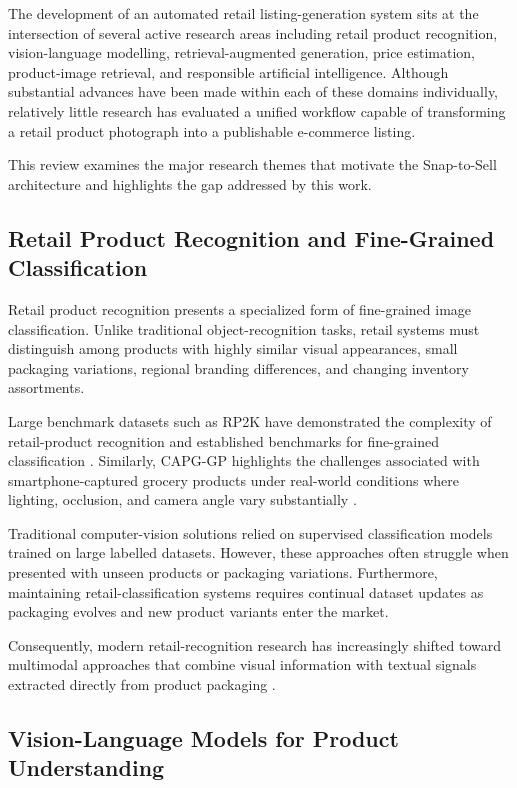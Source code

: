 \documentclass[conference]{IEEEtran}
\begin{document}
The development of an automated retail listing-generation system sits at the
intersection of several active research areas including retail product
recognition, vision-language modelling, retrieval-augmented generation,
price estimation, product-image retrieval, and responsible artificial
intelligence. Although substantial advances have been made within each
of these domains individually, relatively little research has evaluated
a unified workflow capable of transforming a retail product photograph
into a publishable e-commerce listing.

This review examines the major research themes that motivate the
Snap-to-Sell architecture and highlights the gap addressed by this work.

\subsection{Retail Product Recognition and Fine-Grained Classification}

Retail product recognition presents a specialized form of fine-grained image
classification. Unlike traditional object-recognition tasks, retail systems
must distinguish among products with highly similar visual appearances,
small packaging variations, regional branding differences, and changing
inventory assortments.

Large benchmark datasets such as RP2K have demonstrated the complexity of
retail-product recognition and established benchmarks for fine-grained
classification \cite{peng2020rp2k}. Similarly, CAPG-GP highlights the
challenges associated with smartphone-captured grocery products under
real-world conditions where lighting, occlusion, and camera angle vary
substantially \cite{geng2018capg}.

Traditional computer-vision solutions relied on supervised classification
models trained on large labelled datasets. However, these approaches often
struggle when presented with unseen products or packaging variations.
Furthermore, maintaining retail-classification systems requires continual
dataset updates as packaging evolves and new product variants enter the
market.

Consequently, modern retail-recognition research has increasingly shifted
toward multimodal approaches that combine visual information with textual
signals extracted directly from product packaging \cite{ocrfusion2023}.

\subsection{Vision-Language Models for Product Understanding}
\end{document}
